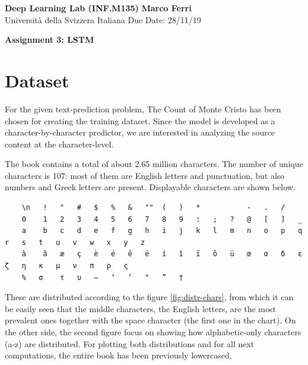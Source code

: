 \documentclass[12pt]{article}
\begin{document}

\textbf{Deep Learning Lab (INF.M135)} \hfill \textbf{Marco Ferri} \\
\normalsize Università della Svizzera Italiana \hfill Due Date: 28/11/19 \\

\begin{center}
\textbf{Assignment 3: LSTM}
\end{center}




\section{Dataset}

For the given text-prediction problem, The Count of Monte Cristo has been chosen for creating the training dataset. Since the model is developed as a character-by-character predictor, we are interested in analyzing the source content at the character-level.

The book contains a total of about 2.65 million characters. The number of unique characters is 107: most of them are English letters and punctuation, but also numbers and Greek letters are present. Displayable characters are shown below.

\begin{verbatim}
	\n	 !	 "	 #	 $	 %	 &	 ""	 (	 )	 *	 		 -	 .	 /	 
	0	 1	 2	 3	 4	 5	 6	 7	 8	 9	 :	 ;	 ?	 @	 [	 ]	 _	 
	a	 b	 c	 d	 e	 f	 g	 h	 i	 j	 k	 l	 m	 n	 o	 p	 q	 r	 s	 t	 u	 v	 w	 x	 y	 z	 
	à	 â	 æ	 ç	 è	 é	 ê	 ë	 í	 î	 ï	 ô	 ü	 œ	 α	 δ	 ε	 ζ	 η	 κ	 μ	 ν	 π	 ρ	 ς	 
	%	σ	 τ	 υ	 —	 ‘	 ’	 "	 ”	 †
\end{verbatim}

These are distributed according to the figure \ref{fig:distr-chars}, from which it can be easily seen that the middle characters, the English letters, are the most prevalent ones together with the space character (the first one in the chart). On the other side, the second figure focus on showing how alphabetic-only characters (a-z) are distributed. For plotting both distributions and for all next computations, the entire book has been previously lowercased.
\end{document}
